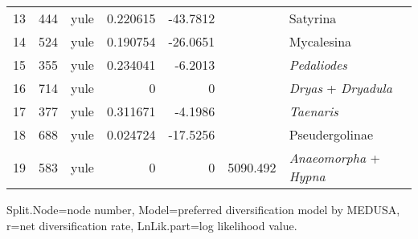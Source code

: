 \documentclass[10pt]{article}
\begin{document}
\begin{table}[!h]
\begin{tabular}{lccrrcl}
13              & 444        & yule  & 0.220615   & -43.7812   &          & Satyrina                                                   \\
14              & 524        & yule  & 0.190754   & -26.0651   &          & Mycalesina                                                 \\
15              & 355        & yule  & 0.234041   & -6.2013    &          & \emph{Pedaliodes}                                          \\
16              & 714        & yule  & 0          & 0          &          & \emph{Dryas} + \emph{Dryadula}                             \\
17              & 377        & yule  & 0.311671   & -4.1986    &          & \emph{Taenaris}                                            \\
18              & 688        & yule  & 0.024724   & -17.5256   &          & Pseudergolinae                                             \\
19              & 583        & yule  & 0          & 0          & 5090.492 & \emph{Anaeomorpha} + \emph{Hypna}                                       
\end{tabular}
\begin{flushleft}Split.Node=node number, Model=preferred diversification model by MEDUSA, r=net diversification rate, LnLik.part=log likelihood value.
\end{flushleft}
\end{table}
\end{document}
